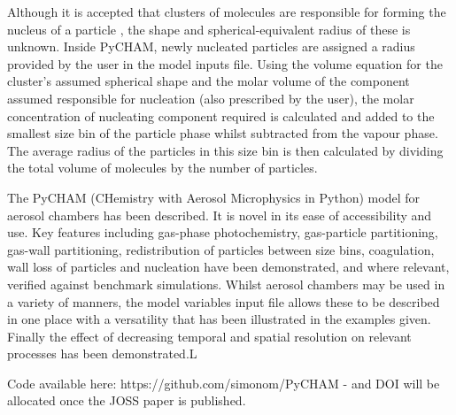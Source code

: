 \documentclass[gmd, manuscript]{copernicus}
\begin{document}
Although it is accepted that clusters of molecules are responsible for forming the nucleus of a particle \citep{Seinfeld2006}, the shape and spherical-equivalent radius of these is unknown.  Inside PyCHAM, newly nucleated particles are assigned a radius provided by the user in the model inputs file.  Using the volume equation for the cluster's assumed spherical shape and the molar volume of the component assumed responsible for nucleation (also prescribed by the user), the molar concentration of nucleating component required is calculated and added to the smallest size bin of the particle phase whilst subtracted from the vapour phase.  The average radius of the particles in this size bin is then calculated by dividing the total volume of molecules by the number of particles.


\conclusions  %
The PyCHAM (CHemistry with Aerosol Microphysics in Python) model for aerosol chambers has been described.  It is novel in its ease of accessibility and use.  Key features including gas-phase photochemistry, gas-particle partitioning, gas-wall partitioning, redistribution of particles between size bins, coagulation, wall loss of particles and nucleation have been demonstrated, and where relevant, verified against benchmark simulations.  Whilst aerosol chambers may be used in a variety of manners, the model variables input file allows these to be described in one place with a versatility that has been illustrated in the examples given.  Finally the effect of decreasing temporal and spatial resolution on relevant processes has been demonstrated.L


Code available here: https://github.com/simonom/PyCHAM - and DOI will be allocated once the JOSS paper is published.






\end{document}
